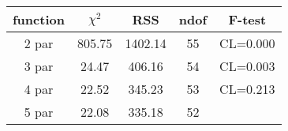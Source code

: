 \begin{tabular}{c|c|c|c|c}
function & $\chi^2$ & RSS & ndof & F-test \\
\hline
2 par & 805.75 & 1402.14 & 55 & CL=0.000 \\
3 par & 24.47 & 406.16 & 54 & CL=0.003 \\
4 par & 22.52 & 345.23 & 53 & CL=0.213 \\
5 par & 22.08 & 335.18 & 52 & \\
\hline
\end{tabular}